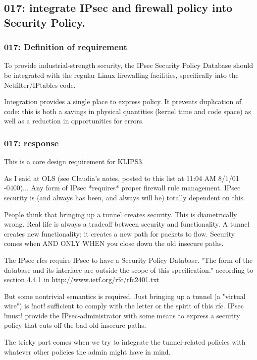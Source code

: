 \subsection{017: integrate IPsec and firewall policy into Security Policy.}

\subsubsection{017: Definition of requirement }

To provide industrial-strength security, the IPsec Security Policy Database
should be integrated with the regular Linux firewalling facilities,
specifically into the Netfilter/IPtables code. 

Integration provides a single place to express policy.
It prevents duplication of code: this is both a savings in physical
quantities (kernel time and code space) as well as a reduction in
opportunities for errors.

\subsubsection{017: response}

This is a core design requirement for KLIPS3.

As I said at OLS (see Claudia's notes, posted to this list at 11:04 AM 
8/1/01 -0400)...  Any form of IPsec *requires* proper firewall rule 
management.  IPsec security is (and always has been, and always will be) 
totally dependent on this.

People think that bringing up a tunnel creates security.  This is 
diametrically wrong.  Real life is always a tradeoff between security and 
functionality.  A tunnel creates new functionality;  it creates a new path 
for packets to flow.  Security comes when AND ONLY WHEN you close down the 
old insecure paths.

The IPsec rfcs require IPsec to have a Security Policy Database.  "The form 
of the database and its interface are outside the scope of this 
specification."  according to section 4.4.1 in
   http://www.ietf.org/rfc/rfc2401.txt

But some nontrivial semantics is required.  Just bringing up a tunnel (a 
"virtual wire") is !not! sufficient to comply with the letter or the spirit 
of this rfc.  IPsec !must! provide the IPsec-administrator with some means 
to express a security policy that cuts off the bad old insecure paths.

The tricky part comes when we try to integrate the tunnel-related policies 
with whatever other policies the admin might have in mind.

